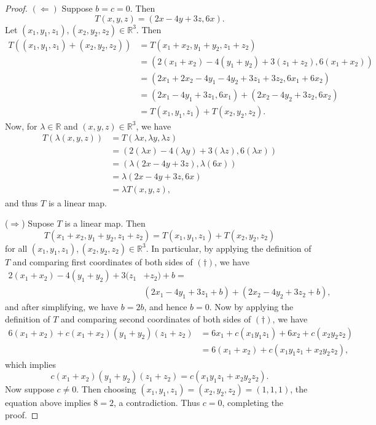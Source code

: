 \documentclass{extarticle}
\newcommand{\R}{\mathbb{R}}
\begin{document}
\begin{proof}
$(\Leftarrow)$ Suppose $b = c = 0$.  Then
\begin{equation*}
T(x,y,z) = (2x - 4y + 3z, 6x).
\end{equation*}
Let $(x_1,y_1,z_1), (x_2,y_2,z_2)\in\R^3$.  Then 
\begin{align*}
T((x_1,y_1,z_1) + (x_2,y_2,z_2)) &= T(x_1 + x_2, y_1 + y_2, z_1 + z_2)\\
&= (2(x_1 + x_2) - 4(y_1 + y_2) + 3(z_1 + z_2), 6(x_1 + x_2))\\
&= (2x_1 + 2x_2 - 4y_1 - 4y_2 + 3z_1 + 3z_2, 6x_1 + 6x_2)\\
&= (2x_1 - 4y_1 + 3z_1, 6x_1) + (2x_2 - 4y_2 + 3z_2, 6x_2)\\
&= T(x_1, y_1, z_1) + T(x_2, y_2,z_2).
\end{align*}
Now, for $\lambda\in\R$ and $(x,y,z)\in\R^3$, we have
\begin{align*}
T(\lambda(x,y,z)) &= T(\lambda x, \lambda y, \lambda z)\\
&= (2(\lambda x) - 4(\lambda y) + 3(\lambda z), 6(\lambda x))\\
&= (\lambda(2x - 4y + 3z), \lambda(6x))\\
&= \lambda(2x - 4y + 3z, 6x)\\
&= \lambda T(x, y, z),
\end{align*}
and thus $T$ is a linear map.
\par ($\Rightarrow$) Supose $T$ is a linear map.  Then
\begin{equation}\tag{$\dagger$}
T(x_1 + x_2,y_1 + y_2, z_1 + z_2) = T(x_1, y_1, z_1) + T(x_2, y_2, z_2)
\end{equation}
for all $(x_1,y_1,z_1),(x_2, y_2, z_2)\in\R^3$.  In particular, by applying the definition of $T$ and comparing first coordinates of both sides of $(\dagger)$, we have
\begin{align*}
2(x_1 + x_2) - 4(y_1+y_2) + 3(z_1&+ z_2) + b =\\ &(2x_1 - 4y_1 + 3z_1 + b) + (2x_2 - 4y_2 +3z_2 + b),
\end{align*}
and after simplifying, we have $b = 2b$, and hence $b= 0$.  Now by applying the definition of $T$ and comparing second coordinates of both sides of $(\dagger)$, we have
\begin{align*}
6(x_1 + x_2) + c(x_1+x_2)(y_1+y_2)(z_1+z_2) &= 6x_1 + c(x_1y_1z_1) + 6x_2 +  c(x_2y_2z_2)\\
&= 6(x_1 + x_2) + c(x_1y_1z_1 + x_2y_2z_2),
\end{align*}
which implies
\begin{equation*}
c(x_1+x_2)(y_1+y_2)(z_1+z_2)  = c(x_1y_1z_1 + x_2y_2z_2).
\end{equation*}
Now suppose $c\neq 0$.  Then choosing $(x_1,y_1,z_1) = (x_2,y_2,z_2) = (1,1,1)$, the equation above implies $8 = 2$, a contradiction.  Thus $c=0$, completing the proof.
\end{proof}
\end{document}
